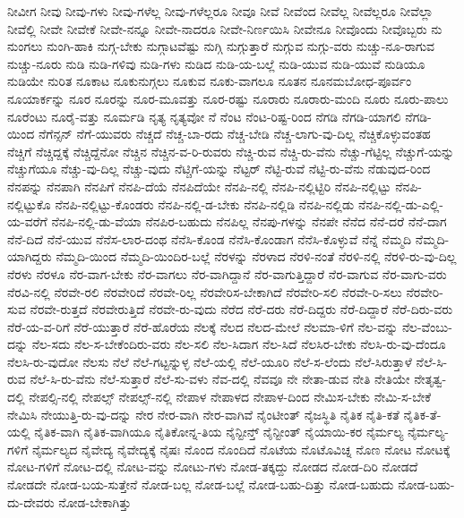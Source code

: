 {ನೀವೀಗ
ನೀವು
ನೀವು-ಗಳು
ನೀವು-ಗಳೆಲ್ಲ
ನೀವು-ಗಳೆಲ್ಲರೂ
ನೀವೂ
ನೀವೆ
ನೀವೆಂದ
ನೀವೆಲ್ಲ
ನೀವೆಲ್ಲರೂ
ನೀವೆಲ್ಲಾ
ನೀವೆಲ್ಲಿ
ನೀವೇ
ನೀವೇಕೆ
ನೀವೇ-ನನ್ನೂ
ನೀವೇ-ನಾದರೂ
ನೀವೇ-ನಿರ್ಣಯಿಸಿ
ನೀವೇನೂ
ನೀವೊಂದು
ನೀವೊಬ್ಬರು
ನು
ನುಂಗಲು
ನುಂಗಿ-ಹಾಕಿ
ನುಗ್ಗ-ಬೇಕು
ನುಗ್ಗಾಟವೆಷ್ಟು
ನುಗ್ಗಿ
ನುಗ್ಗುತ್ತಾರೆ
ನುಗ್ಗುವ
ನುಗ್ಗು-ವರು
ನುಚ್ಚು-ನೂ-ರಾಗುವ
ನುಚ್ಚು-ನೂರು
ನುಡಿ
ನುಡಿ-ಗಳಿವು
ನುಡಿ-ಗಳು
ನುಡಿದ
ನುಡಿ-ಯ-ಬಲ್ಲೆ
ನುಡಿ-ಯುವ
ನುಡಿ-ಯುವೆ
ನುಡಿಯೂ
ನುಡಿಯೇ
ನುರಿತ
ನೂಕಾಟ
ನೂಕುನುಗ್ಗಲು
ನೂಕುವ
ನೂಕು-ವಾಗಲೂ
ನೂತನ
ನೂನಮಬೋಧ-ಪೂರ್ವಂ
ನೂಯಾರ್ಕನ್ನು
ನೂರ
ನೂರನ್ನು
ನೂರ-ಮೂವತ್ತು
ನೂರ-ರಷ್ಟು
ನೂರಾರು
ನೂರಾರು-ಮಂದಿ
ನೂರು
ನೂರು-ಪಾಲು
ನೂರೆಂಟು
ನೂರೈ-ವತ್ತು
ನೂರ್ಮಡಿ
ನೃತ್ಯ
ನೃತ್ಯವೋ
ನೆ
ನೆಂಟ
ನೆಂಟ-ರಿಷ್ಟ-ರಿಂದ
ನೆಗಡಿ
ನೆಗಡಿ-ಯಾಗಲಿ
ನೆಗಡಿ-ಯಿಂದ
ನೆಗೆನ್ಸನ್
ನೆಗೆ-ಯುವರು
ನೆಚ್ಚದೆ
ನೆಚ್ಚ-ಬಾ-ರದು
ನೆಚ್ಚ-ಬೇಡಿ
ನೆಚ್ಚ-ಲಾಗು-ವು-ದಿಲ್ಲ
ನೆಚ್ಚಿಕೊಳ್ಳುವಂತಹ
ನೆಚ್ಚಿಗೆ
ನೆಚ್ಚಿದ್ದಕ್ಕೆ
ನೆಚ್ಚಿದ್ದೆನೋ
ನೆಚ್ಚಿನ
ನೆಚ್ಚಿನ-ವ-ರಿ-ರುವರು
ನೆಚ್ಚಿ-ರುವ
ನೆಚ್ಚಿ-ರು-ವೆನು
ನೆಚ್ಚು-ಗೆಟ್ಟಿಲ್ಲ
ನೆಚ್ಚುಗೆ-ಯನ್ನು
ನೆಚ್ಚುಗೆಯೂ
ನೆಚ್ಚು-ವು-ದಿಲ್ಲ
ನೆಚ್ಚು-ವುದು
ನೆಟ್ಚಿಗೆ-ಯನ್ನು
ನೆಟ್ಟರ್
ನೆಟ್ಟಿ-ರುವೆ
ನೆಟ್ಟಿ-ರು-ವೆನು
ನೆಡುವುದ-ರಿಂದ
ನೆನಪನ್ನು
ನೆನಪಾಗಿ
ನೆನಪಿಗೆ
ನೆನಪಿ-ದೆಯೆ
ನೆನಪಿದೆಯೇ
ನೆನಪಿ-ನಲ್ಲಿ
ನೆನಪಿ-ನಲ್ಲಿಟ್ಟಿರಿ
ನೆನಪಿ-ನಲ್ಲಿಟ್ಟು
ನೆನಪಿ-ನಲ್ಲಿಟ್ಟುಕೊ
ನೆನಪಿ-ನಲ್ಲಿಟ್ಟು-ಕೊಂಡರು
ನೆನಪಿ-ನಲ್ಲಿ-ಡ-ಬೇಕು
ನೆನಪಿ-ನಲ್ಲಿಡಿ
ನೆನಪಿ-ನಲ್ಲಿಡು
ನೆನಪಿ-ನಲ್ಲಿ-ಡು-ಎಲ್ಲಿ-ಯ-ವರೆಗೆ
ನೆನಪಿ-ನಲ್ಲಿ-ಡು-ವೆಯಾ
ನೆನಪಿರ-ಬಹುದು
ನೆನಪಿಲ್ಲ
ನೆನಪು-ಗಳನ್ನು
ನೆನಪೇ
ನೆನೆದ
ನೆನೆ-ದರೆ
ನೆನೆ-ದಾಗ
ನೆನೆ-ದಿದೆ
ನೆನೆ-ಯುವ
ನೆನೆಸ-ಲಾರ-ದಂಥ
ನೆನೆಸಿ-ಕೊಂಡ
ನೆನೆಸಿ-ಕೊಂಡಾಗ
ನೆನೆಸಿ-ಕೊಳ್ಳುವೆ
ನೆನ್ನೆ
ನೆಮ್ಮದಿ
ನೆಮ್ಮದಿ-ಯಾಗಿದ್ದರು
ನೆಮ್ಮದಿ-ಯಿಂದ
ನೆಮ್ಮದಿ-ಯಿಂದಿರ-ಬಲ್ಲೆ
ನೆರಳನ್ನು
ನೆರಳಾದ
ನೆರಳಿ-ನಂತೆ
ನೆರಳಿ-ನಲ್ಲಿ
ನೆರಳಿ-ರು-ವು-ದಿಲ್ಲ
ನೆರಳು
ನೆರಳೂ
ನೆರ-ವಾಗ-ಬೇಕು
ನೆರ-ವಾಗಲು
ನೆರ-ವಾಗಿದ್ದಾನೆ
ನೆರ-ವಾಗುತ್ತಿದ್ದಾರೆ
ನೆರ-ವಾಗುವ
ನೆರ-ವಾಗು-ವರು
ನೆರವಿ-ನಲ್ಲಿ
ನೆರವೇ-ರಲಿ
ನೆರವೇರಿದೆ
ನೆರವೇ-ರಿಲ್ಲ
ನೆರವೇರಿಸ-ಬೇಕಾಗಿದೆ
ನೆರವೇರಿ-ಸಲಿ
ನೆರವೇ-ರಿ-ಸಲು
ನೆರವೇರಿ-ಸುವ
ನೆರವೇ-ರುತ್ತದೆ
ನೆರವೇರುತ್ತಿದೆ
ನೆರವೇ-ರು-ವುದು
ನೆರೆದ
ನೆರೆ-ದರು
ನೆರೆ-ದಿದ್ದರು
ನೆರೆ-ದಿದ್ದಾರೆ
ನೆರೆ-ದಿರು-ವರು
ನೆರೆ-ಯ-ವ-ರಿಗೆ
ನೆರೆ-ಯುತ್ತಾರೆ
ನೆರೆ-ಹೊರೆಯ
ನೆಲಕ್ಕೆ
ನೆಲದ
ನೆಲದ-ಮೇಲೆ
ನೆಲಮಾ-ಳಿಗೆ
ನೆಲ-ವನ್ನು
ನೆಲ-ವೆಂಬು-ದನ್ನು
ನೆಲ-ಸದು
ನೆಲ-ಸ-ಬೇಕೆಂದಿರು-ವರು
ನೆಲ-ಸಲಿ
ನೆಲ-ಸಿದಾಗ
ನೆಲ-ಸಿದೆ
ನೆಲಸಿರ-ಬೇಕು
ನೆಲಸಿ-ರು-ವು-ದೆಂದೂ
ನೆಲಸಿ-ರು-ವುದೋ
ನೆಲಸು
ನೆಲೆ
ನೆಲೆ-ಗಟ್ಟನ್ನುಳ್ಳ
ನೆಲೆ-ಯಲ್ಲಿ
ನೆಲೆ-ಯೂರಿ
ನೆಲೆ-ಸ-ಲೆಂದು
ನೆಲೆ-ಸಿರುತ್ತಾಳೆ
ನೆಲೆ-ಸಿ-ರುವ
ನೆಲೆ-ಸಿ-ರು-ವೆನು
ನೆಲೆ-ಸುತ್ತಾರೆ
ನೆಲೆ-ಸು-ವಳು
ನೆವ-ದಲ್ಲಿ
ನೆವವೂ
ನೇ
ನೇತಾ-ಡುವ
ನೇತಿ
ನೇತಿಯೇ
ನೇತೃತ್ವ-ದಲ್ಲಿ
ನೇಪಲ್ಸಿ-ನಲ್ಲಿ
ನೇಪಲ್ಸ್
ನೇಪಲ್ಸ್-ನಲ್ಲಿ
ನೇಪಾಳ
ನೇಪಾಳದ
ನೇಪಾಳ-ದಿಂದ
ನೇಮಿಸ-ಬೇಕು
ನೇಮಿ-ಸ-ಬೇಕೆ
ನೇಮಿಸಿ
ನೇಯುತ್ತಿ-ರು-ವು-ದನ್ನು
ನೇರ
ನೇರ-ವಾಗಿ
ನೇರ-ವಾಗಿವೆ
ನೈಂಟೀಂತ್
ನೈಜಸ್ಥಿತಿ
ನೈತಿಕ
ನೈತಿ-ಕತೆ
ನೈತಿಕ-ತೆ-ಯಲ್ಲಿ
ನೈತಿಕ-ವಾಗಿ
ನೈತಿಕ-ವಾಗಿಯೂ
ನೈತಿಕೋನ್ನ-ತಿಯ
ನೈನ್ಟೀನ್ತ್
ನೈನ್ಟೀಂತ್
ನೈಯಾಯಿ-ಕರ
ನೈರ್ಮಲ್ಯ
ನೈರ್ಮಲ್ಯ-ಗಳಿಗೆ
ನೈರ್ಮಲ್ಯದ
ನೈವೇದ್ಯ
ನೈವೇದ್ಯಕ್ಕೆ
ನೈಷಃ
ನೊಂದ
ನೊಂದಿದೆ
ನೊಟೆಯ
ನೊಟೊವಿಚ್ನ
ನೊಣ
ನೋಟ
ನೋಟಕ್ಕೆ
ನೋಟ-ಗಳಿಗೆ
ನೋಟ-ದಲ್ಲಿ
ನೋಟ-ವನ್ನು
ನೋಟು-ಗಳು
ನೋಡ-ತಕ್ಕದ್ದು
ನೋಡದ
ನೋಡ-ದಿರಿ
ನೋಡದೆ
ನೋಡದೇ
ನೋಡ-ಬಯ-ಸುತ್ತೇನೆ
ನೋಡ-ಬಲ್ಲ
ನೋಡ-ಬಲ್ಲೆ
ನೋಡ-ಬಹು-ದಿತ್ತು
ನೋಡ-ಬಹುದು
ನೋಡ-ಬಹು-ದು-ದೇವರು
ನೋಡ-ಬೇಕಾಗಿತ್ತು
}
